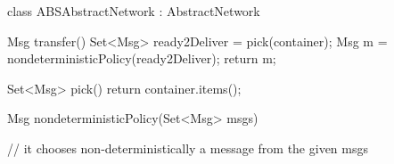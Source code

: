 class ABSAbstractNetwork : AbstractNetwork{
 
    Msg transfer() {
        Set<Msg> ready2Deliver = pick(container);
        Msg m = nondeterministicPolicy(ready2Deliver);
        return m;
    }
    
    Set<Msg> pick() {
        return container.items();
    }
    
    Msg nondeterministicPolicy(Set<Msg> msgs)
    {
        // it chooses non-deterministically a message from the given msgs

    }
    
}